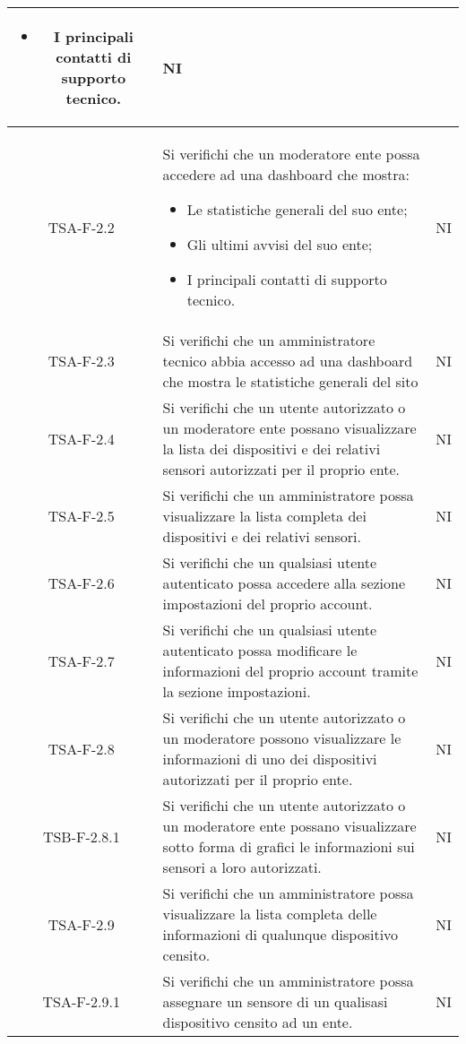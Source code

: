 \begin{center}
\begin{longtable}{|c|p{10cm}|c|}
\begin{itemize}
			 	\item I principali contatti di supporto tecnico.
			 \end{itemize} & NI \\
			 \hline
			 TSA-F-2.2 & Si verifichi che un moderatore ente possa accedere ad una dashboard che mostra:
			 \begin{itemize}
			 	\item Le statistiche generali del suo ente;
			 	\item Gli ultimi avvisi del suo ente;
			 	\item I principali contatti di supporto tecnico.
			 \end{itemize} & NI \\
			 \hline
			 TSA-F-2.3 & Si verifichi che un amministratore tecnico abbia accesso ad una dashboard che mostra le statistiche generali del sito & NI \\
			 \hline
			 TSA-F-2.4 & Si verifichi che un utente autorizzato o un moderatore ente possano visualizzare la lista dei dispositivi e dei relativi sensori autorizzati per il proprio ente. & NI \\
			 \hline
			 TSA-F-2.5 & Si verifichi che un amministratore possa visualizzare la lista completa dei dispositivi e dei relativi sensori. & NI \\
			 \hline
			 TSA-F-2.6 & Si verifichi che un qualsiasi utente autenticato possa accedere alla sezione impostazioni del proprio account. & NI \\
			 \hline
			 TSA-F-2.7 & Si verifichi che un qualsiasi utente autenticato possa modificare le informazioni del proprio account tramite la sezione impostazioni. & NI \\
			 \hline
			 TSA-F-2.8 & Si verifichi che un utente autorizzato o un moderatore possono visualizzare le informazioni di uno dei dispositivi autorizzati per il proprio ente. & NI \\
			 \hline
			 TSB-F-2.8.1 & Si verifichi che un utente autorizzato o un moderatore ente possano visualizzare sotto forma di grafici le informazioni sui sensori a loro autorizzati. & NI \\
			 \hline
			 TSA-F-2.9 & Si verifichi che un amministratore possa visualizzare la lista completa delle informazioni di qualunque dispositivo censito. & NI \\
			 \hline
			 TSA-F-2.9.1 & Si verifichi che un amministratore possa assegnare un sensore di un qualisasi dispositivo censito ad un ente. & NI \\
			 \hline

\end{longtable}
\end{center}
